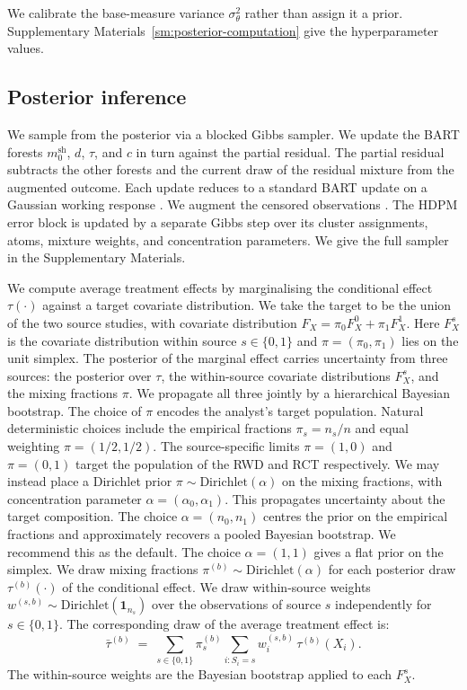 We calibrate the base-measure variance $\sigma_\theta^2$ rather than assign it a prior.
Supplementary Materials~\ref{sm:posterior-computation} give the hyperparameter values.






\subsection{Posterior inference}

We sample from the posterior via a blocked Gibbs sampler.
We update the BART forests $m_0^{\mathrm{sh}}$, $d$, $\tau$, and $c$ in turn against the partial residual.
The partial residual subtracts the other forests and the current draw of the residual mixture from the augmented outcome.
Each update reduces to a standard BART update on a Gaussian working response \citep{chipman2010bart}.
We augment the censored observations \citep{tanner1987}.
The HDPM error block is updated by a separate Gibbs step over its cluster assignments, atoms, mixture weights, and concentration parameters.
We give the full sampler in the Supplementary Materials.

We compute average treatment effects by marginalising the conditional effect $\tau(\cdot)$ against a target covariate distribution.
We take the target to be the union of the two source studies, with covariate distribution $F_X = \pi_0 F_X^0 + \pi_1 F_X^1$.
Here $F_X^s$ is the covariate distribution within source $s \in \{0, 1\}$ and $\pi = (\pi_0, \pi_1)$ lies on the unit simplex.
The posterior of the marginal effect carries uncertainty from three sources: the posterior over $\tau$, the within-source covariate distributions $F_X^s$, and the mixing fractions $\pi$.
We propagate all three jointly by a hierarchical Bayesian bootstrap.
The choice of $\pi$ encodes the analyst's target population.
Natural deterministic choices include the empirical fractions $\pi_s = n_s / n$ and equal weighting $\pi = (1/2, 1/2)$.
The source-specific limits $\pi = (1, 0)$ and $\pi = (0, 1)$ target the population of the RWD and RCT respectively.
We may instead place a Dirichlet prior $\pi \sim \mathrm{Dirichlet}(\alpha)$ on the mixing fractions, with concentration parameter $\alpha = (\alpha_0, \alpha_1)$.
This propagates uncertainty about the target composition.
The choice $\alpha = (n_0, n_1)$ centres the prior on the empirical fractions and approximately recovers a pooled Bayesian bootstrap.
We recommend this as the default.
The choice $\alpha = (1, 1)$ gives a flat prior on the simplex.
We draw mixing fractions $\pi^{(b)} \sim \mathrm{Dirichlet}(\alpha)$ for each posterior draw $\tau^{(b)}(\cdot)$ of the conditional effect.
We draw within-source weights $w^{(s, b)} \sim \mathrm{Dirichlet}(\mathbf{1}_{n_s})$ over the observations of source $s$ independently for $s \in \{0, 1\}$.
The corresponding draw of the average treatment effect is:
\begin{equation}
\bar{\tau}^{(b)} \;=\; \sum_{s \in \{0, 1\}} \pi_s^{(b)} \sum_{i: S_i = s} w_i^{(s, b)}\, \tau^{(b)}(X_i).
\label{eq:ate-bb}
\end{equation}
The within-source weights are the Bayesian bootstrap \citep{Rubin1981} applied to each $F_X^s$.
 
